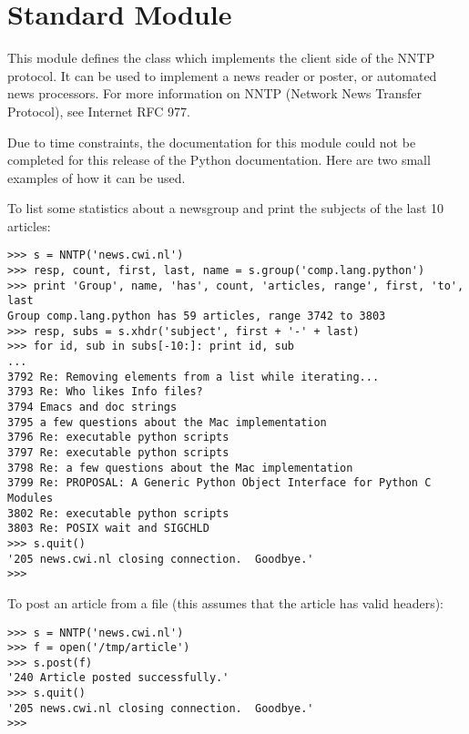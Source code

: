 \section{Standard Module }

\renewcommand{\indexsubitem}{(in module nntplib)}

This module defines the class  which implements the client
side of the NNTP protocol.  It can be used to implement a news reader
or poster, or automated news processors.  For more information on NNTP
(Network News Transfer Protocol), see Internet RFC 977.

Due to time constraints, the documentation for this module could not
be completed for this release of the Python documentation.  Here are
two small examples of how it can be used.

To list some statistics about a newsgroup and print the subjects of
the last 10 articles:

\begin{verbatim}
>>> s = NNTP('news.cwi.nl')
>>> resp, count, first, last, name = s.group('comp.lang.python')
>>> print 'Group', name, 'has', count, 'articles, range', first, 'to', last
Group comp.lang.python has 59 articles, range 3742 to 3803
>>> resp, subs = s.xhdr('subject', first + '-' + last)
>>> for id, sub in subs[-10:]: print id, sub
... 
3792 Re: Removing elements from a list while iterating...
3793 Re: Who likes Info files?
3794 Emacs and doc strings
3795 a few questions about the Mac implementation
3796 Re: executable python scripts
3797 Re: executable python scripts
3798 Re: a few questions about the Mac implementation 
3799 Re: PROPOSAL: A Generic Python Object Interface for Python C Modules
3802 Re: executable python scripts 
3803 Re: POSIX wait and SIGCHLD
>>> s.quit()
'205 news.cwi.nl closing connection.  Goodbye.'
>>> 
\end{verbatim}

To post an article from a file (this assumes that the article has
valid headers):

\begin{verbatim}
>>> s = NNTP('news.cwi.nl')
>>> f = open('/tmp/article')
>>> s.post(f)
'240 Article posted successfully.'
>>> s.quit()
'205 news.cwi.nl closing connection.  Goodbye.'
>>> 
\end{verbatim}
